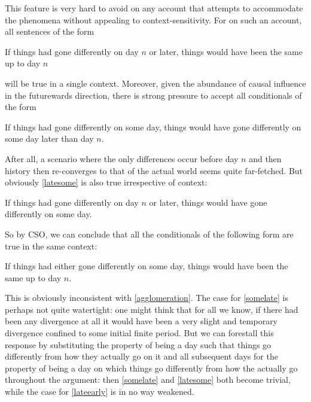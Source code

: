 \documentclass[If.tex]{subfiles}
\begin{document}

This feature is very hard to avoid on any account that attempts to accommodate the phenomena without appealing to context-sensitivity. For on such an account, all sentences of the form
\begin{prop}
	\nitem \label{lateearly}
		If things had gone differently on day $n$ or later, things would have been the same up to day $n$
\end{prop}
will be true in a single context. Moreover, given the abundance of causal influence in the futurewards direction, there is strong pressure to accept all conditionals of the form
\begin{prop}
	\nitem \label{somelate}
		If things had gone differently on some day, things would have gone differently on some day later than day $n$.
\end{prop}
After all, a scenario where the only differences occur before day $n$ and then history then re-converges to that of the actual world seems quite far-fetched. But obviously \ref{latesome} is also true irrespective of context:
\begin{prop}
	\nitem \label{latesome}
		If things had gone differently on day $n$ or later, things would have gone differently on some day.
\end{prop}
So by CSO, we can conclude that all the conditionals of the following form are true in the same context:
\begin{prop}
	\nitem \label{someearly}
		If things had either gone differently on some day, things would have been the same up to day $n$.
\end{prop}
This is obviously inconsistent with \ref{agglomeration}. The case for \ref{somelate} is perhaps not quite watertight: one might think that for all we know, if there had been any divergence at all it would have been a very slight and temporary divergence confined to some initial finite period. But we can forestall this response by substituting the property of being a day such that things go differently from how they actually go on it and all subsequent days for the property of being a day on which things go differently from how the actually go throughout the argument: then \ref{somelate} and \ref{latesome} both become trivial, while the case for \ref{lateearly} is in no way weakened.
\end{document}
